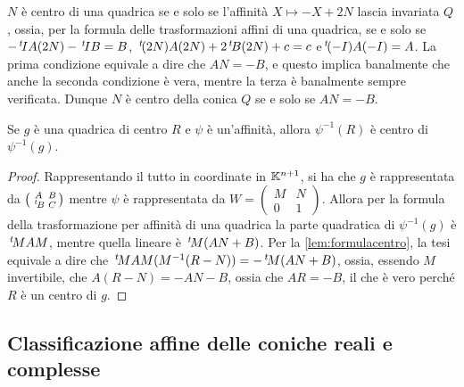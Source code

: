 \begin{remark}\label{lem:formulacentro}
 $N$ è centro di una quadrica se e solo se l'affinità $X\mapsto -X+2N$ lascia invariata $Q$, ossia, per la formula delle trasformazioni affini
 di una quadrica, se e solo se $-\, ^{t}\!IA(2N)-\, ^{t}\!IB=B$, $\, ^{t}\!(2N)A(2N)+2\, ^{t}\!B(2N)+c=c$ e$\, ^{t}\!(-I)A(-I)=A$. La prima condizione equivale a
 dire che $AN=-B$, e questo implica banalmente che anche la seconda condizione è vera, mentre la terza è banalmente sempre verificata.
 Dunque $N$ è centro della conica $Q$ se e solo se $AN=-B$.
\end{remark}
	
 \begin{lemma}\label{lem:centroaff}
  Se $g$ è una quadrica di centro $R$ e $\psi$ è un'affinità, allora $\psi^{-1}(R)$ è centro di $\psi^{-1}(g)$.
 \end{lemma}
 
 \begin{proof}
	Rappresentando il tutto in coordinate in $\mathbb K^{n+1}$, si ha che $g$ è rappresentata da $\left(\begin{smallmatrix}A & B \\ \, ^{t}\!B & C
	\end{smallmatrix} \right)$ mentre $\psi$ è rappresentata da $W=\left(\begin{smallmatrix} M & N \\ 0 & 1 \end{smallmatrix} \right)$.
	Allora per la formula della trasformazione per affinità di una quadrica la parte quadratica di $\psi^{-1}(g)$ è $\, ^{t}\!MAM$, mentre quella
	lineare è $\, ^{t}\!M(AN+B)$.
	Per la \cref{lem:formulacentro}, la tesi equivale a dire che $\, ^{t}\!MAM(M^{-1}(R-N))=-\, ^{t}\!M(AN+B)$, ossia, essendo $M$ invertibile,
	che $A(R-N)=-AN-B$, ossia che $AR=-B$, il che è vero perché $R$ è un centro di $g$.
 \end{proof}

\subsection{Classificazione affine delle coniche reali e complesse}

